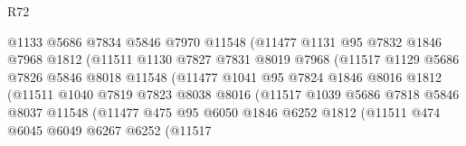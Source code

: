 \begin{lexlean}{R72}
\begin{coremodule}
                              @1133
                              @5686
                              @7834
                              @5846
                              @7970
                              @11548
                              (@11477
                                @1131
                                @95
                                @7832
                                @1846
                                @7968
                                @1812
                                (@11511
                                  @1130
                                  @7827
                                  @7831
                                  @8019
                                  @7968
                                  (@11517
                                    @1129
                                    @5686
                                    @7826
                                    @5846
                                    @8018
                                    @11548
                                    (@11477
                                      @1041
                                      @95
                                      @7824
                                      @1846
                                      @8016
                                      @1812
                                      (@11511
                                        @1040
                                        @7819
                                        @7823
                                        @8038
                                        @8016
                                        (@11517
                                          @1039
                                          @5686
                                          @7818
                                          @5846
                                          @8037
                                          @11548
                                          (@11477
                                            @475
                                            @95
                                            @6050
                                            @1846
                                            @6252
                                            @1812
                                            (@11511
                                              @474
                                              @6045
                                              @6049
                                              @6267
                                              @6252
                                              (@11517

\end{coremodule}
\end{lexlean}
